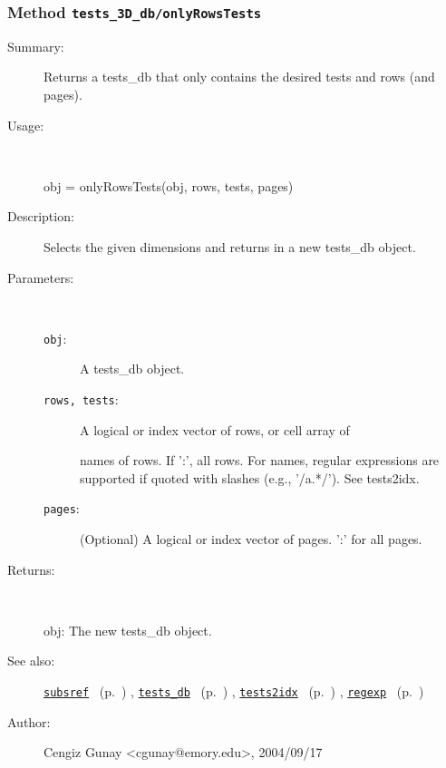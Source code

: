\subsubsection[Method \texttt{onlyRowsTests}]{Method \texttt{tests\_3D\_db/onlyRowsTests}}%
%
\label{ref_tests_3D_db__onlyRowsTests}%
\hypertarget{ref_tests_3D_db__onlyRowsTests}{}%
\begin{description}
\item[Summary:]Returns a tests\_db that only contains the desired 
		tests and rows (and pages).
%
\item[Usage:]~%
\begin{lyxcode}%
obj = onlyRowsTests(obj, rows, tests, pages)
%
\end{lyxcode}%
%
\item[Description:]%
Selects the given dimensions and returns in a new tests\_db object.
\item[Parameters:]~
\begin{description}%
\item[\texttt{obj}:]
 A tests\_db object.
\item[\texttt{rows, tests}:]
 A logical or index vector of rows, or cell array of

names of rows. If ':', all rows. For names, regular expressions are
supported if quoted with slashes (e.g., '/a.*/'). See tests2idx.
\item[\texttt{pages}:]
 (Optional) A logical or index vector of pages. ':' for all pages.
\end{description}%
%
\item[Returns:
]~

	obj: The new tests\_db object.
%
%
\item[See also:]%
\hyperlink{ref_subsref}{\texttt{subsref}}%
\ (p.~\pageref{ref_subsref})%
%
, \hyperlink{ref_tests_db}{\texttt{tests\_db}}%
\ (p.~\pageref{ref_tests_db})%
%
, \hyperlink{ref_tests2idx}{\texttt{tests2idx}}%
\ (p.~\pageref{ref_tests2idx})%
%
, \hyperlink{ref_regexp}{\texttt{regexp}}%
\ (p.~\pageref{ref_regexp})%
%
%
\item[Author:]%
Cengiz Gunay <cgunay@emory.edu>, 2004/09/17
%
\end{description}
\methodline%
